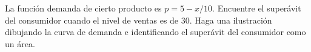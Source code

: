 \item La función demanda de cierto producto es $p = 5 - x/10$. Encuentre el superávit del consumidor cuando el nivel de ventas es de 30. Haga una ilustración dibujando la curva de demanda e identificando el superávit del consumidor como un área.
